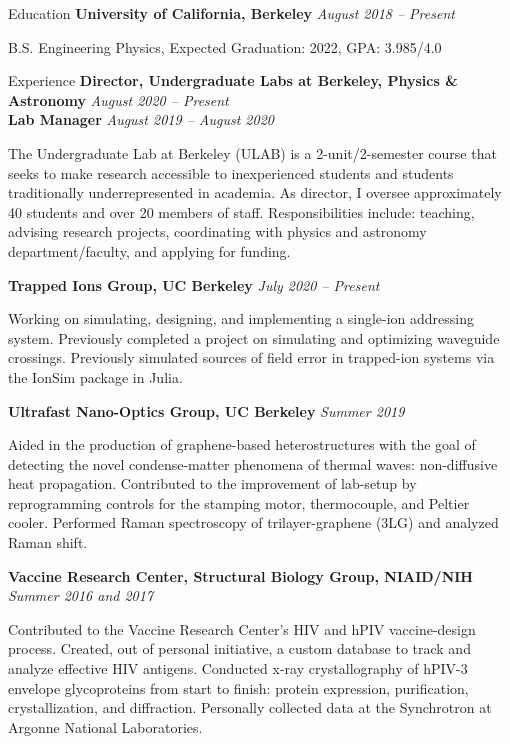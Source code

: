 \documentclass{resume}
\newenvironment{indented}{\vspace{-5pt}\begin{list}{}{\setlength{\leftmargin}{0.5cm}}\item[]}{\end{list}}
\begin{document}
	
	\begin{rSection}{Education}
		{\bf University of California, Berkeley} \hfill {\em August 2018 -- Present} 
		\begin{indented}
			B.S. Engineering Physics, Expected Graduation: 2022, GPA: 3.985/4.0
		\end{indented}
	\end{rSection}

	\begin{rSection}{Experience}
		{\bf Director, Undergraduate Labs at Berkeley, Physics \& Astronomy  } \hfill {\em August 2020 -- Present}\\
		{\bf Lab Manager } \hfill {\em August 2019 -- August 2020}
		\begin{indented}
			The Undergraduate Lab at Berkeley (ULAB) is a 2-unit/2-semester course that seeks to make research accessible to inexperienced students and students traditionally underrepresented in academia. As director, I oversee approximately 40 students and over 20 members of staff. Responsibilities include: teaching, advising research projects, coordinating with physics and astronomy department/faculty, and applying for funding.
		\end{indented}
		
		\vspace{-1pt} {\bf Trapped Ions Group, UC Berkeley} \hfill {\em July 2020 -- Present}
		\begin{indented}
			Working on simulating, designing, and implementing a single-ion addressing system. Previously completed a project on simulating and optimizing waveguide crossings. Previously simulated sources of field error in trapped-ion systems via the IonSim package in Julia.
		\end{indented}
		
		
		\vspace{-1pt} {\bf Ultrafast Nano-Optics Group, UC Berkeley} \hfill {\em Summer 2019}
		\begin{indented}
			Aided in the production of graphene-based heterostructures with the goal of detecting the novel condense-matter phenomena of thermal waves: non-diffusive heat propagation. Contributed to the improvement of lab-setup by reprogramming controls for the stamping motor, thermocouple, and Peltier cooler. Performed Raman spectroscopy of trilayer-graphene (3LG) and analyzed Raman shift.
		\end{indented}
	
		\vspace{-1pt} {\bf Vaccine Research Center, Structural Biology Group, NIAID/NIH} \hfill {\em Summer 2016 and 2017}
		\begin{indented}
			Contributed to the Vaccine Research Center's HIV and hPIV vaccine-design process. Created, out of personal initiative, a custom database to track and analyze effective HIV antigens. Conducted x-ray crystallography of hPIV-3 envelope glycoproteins from start to finish: protein expression, purification, crystallization, and diffraction. Personally collected data at the Synchrotron at Argonne National Laboratories.
		\end{indented}
		

\end{rSection}
\end{document}

